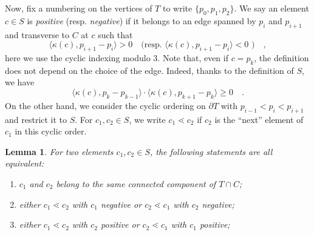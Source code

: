 \documentclass[pdftex,a4paper,12pt]{scrartcl}
\theoremstyle{plain}
\newtheorem{lemma}[theorem]{Lemma}
\theoremstyle{definition}
\theoremstyle{remark}
\numberwithin{equation}{section}
\begin{document}
Now, fix a numbering on the vertices of $T$ to write $\{p_0,p_1,p_2\}$.
We say an element $c\in S$ is \emph{positive} (resp. \emph{negative}) if it belongs to an edge spanned by $p_i$ and $p_{i+1}$ and transverse to $C$ at $c$ such that
\[
\langle\kappa(c),p_{i+1}-p_i\rangle > 0
\quad\text{(resp. } \langle\kappa(c),p_{i+1}-p_i\rangle < 0\text{ )}
\quad,
\]
here we use the cyclic indexing modulo $3$.
Note that, even if $c=p_k$, the definition does not depend on the choice of the edge.
Indeed, thanks to the definition of $S$, we have
\[
\langle\kappa(c),p_k-p_{k-1}\rangle\cdot\langle\kappa(c),p_{k+1}-p_k\rangle\ge 0
\quad.
\]
On the other hand, we consider the cyclic ordering on $\partial T$ with $p_{i-1}<p_i<p_{i+1}$ and restrict it to $S$.
For $c_1,c_2\in S$, we write $c_1\lessdot c_2$ if $c_2$ is the ``next'' element of $c_1$ in this cyclic order.

\begin{lemma}
For two elements $c_1,c_2\in S$, the following statements are all equivalent:
\begin{enumerate}[label=\upshape(\alph*)]
  \item $c_1$ and $c_2$ belong to the same connected component of $T\cap C$;
  \item either $c_1\lessdot c_2$ with $c_1$ negative or $c_2\lessdot c_1$ with $c_2$ negative;
  \item either $c_1\lessdot c_2$ with $c_2$ positive or $c_2\lessdot c_1$ with $c_1$ positive;
\end{enumerate}
\end{lemma}
\end{document}
